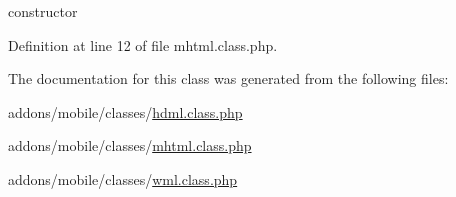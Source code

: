 constructor 



Definition at line 12 of file mhtml.\+class.\+php.



The documentation for this class was generated from the following files\+:\begin{DoxyCompactItemize}
\item 
addons/mobile/classes/\hyperlink{hdml_8class_8php}{hdml.\+class.\+php}\item 
addons/mobile/classes/\hyperlink{mhtml_8class_8php}{mhtml.\+class.\+php}\item 
addons/mobile/classes/\hyperlink{wml_8class_8php}{wml.\+class.\+php}\end{DoxyCompactItemize}
